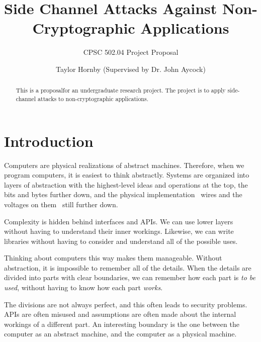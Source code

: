 \documentclass{acm_proc_article-sp}
\begin{document}
\sloppy

\title{Side Channel Attacks Against Non-Cryptographic Applications}
\subtitle{CPSC 502.04 Project Proposal}


\author{
\alignauthor
Taylor Hornby (Supervised by Dr. John Aycock)\\
}


\maketitle


\begin{abstract}
This is a proposal\footnotemark[1] for an undergraduate research project. The
project is to apply side-channel attacks to non-cryptographic applications.
\end{abstract}

\section{Introduction}
\label{sec:attacks}

Computers are physical realizations of abstract machines. Therefore, when we
program computers, it is easiest to think abstractly. Systems are organized into
layers of abstraction with the highest-level ideas and operations at the top,
the bits and bytes further down, and the physical implementation \textendash\
wires and the voltages on them \textendash\ still further down.

Complexity is hidden behind interfaces and APIs. We can use lower layers without
having to understand their inner workings. Likewise, we can write libraries
without having to consider and understand all of the possible uses.

Thinking about computers this way makes them manageable. Without abstraction, it
is impossible to remember all of the details. When the details are divided into
parts with clear boundaries, we can remember how each part is \emph{to be used},
without having to know how each part \emph{works}.

The divisions are not always perfect, and this often leads to security problems.
APIs are often misused and assumptions are often made about the internal
workings of a different part. An interesting boundary is the one between the
computer as an abstract machine, and the computer as a physical machine.
\end{document}
